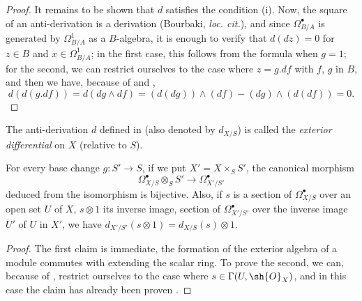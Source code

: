 \begin{proof}
It remains to be shown that $d$ satisfies the condition \rm{(i)}.
Now, the square of an anti-derivation is a derivation (Bourbaki, \emph{loc. cit.}), and since $\Omega_{B/A}^\bullet$ is generated by $\Omega_{B/A}^1$ as a $B$-algebra, it is enough to verify that $d(dz) = 0$ for $z \in B$ and $x \in \Omega_{B/A}^1$;
in the first case, this follows from the formula  when $g = 1$;
for the second, we can restrict ourselves to the case where $z = g.df$ with $f$, $g$ in $B$, and then we have, because of  and , 
\[
  d(d(g.df)) = d(dg \wedge df) = (d(dg)) \wedge (df) - (dg) \wedge (d(df)) = 0.
\] 
\end{proof}

\begin{definition}[16.6.3]
\label{IV.16.6.3}
The anti-derivation $d$ defined in  (also denoted by $d_{X/S}$) is called the \emph{exterior differential} on $X$ (relative to $S$). 
\end{definition}

\begin{proposition}[16.6.4]
\label{IV.16.6.4}
For every base change $g:S' \to S$, if we put $X' = X \times_S S'$, the canonical morphism
\[
  \label{IV.16.6.4.1}
  \Omega_{X/S}^\bullet \otimes_S S' \to \Omega_{X'/S'}^\bullet
  \tag{16.6.4.1}
\]
deduced from the isomorphism  is bijective.
Also, if $s$ is a section of $\Omega_{X/S}^\bullet$ over an open set $U$ of $X$, $s \otimes 1$ its inverse image, section of $\Omega_{X'/S'}^\bullet$ over the inverse image $U'$ of $U$ in $X'$, we have $d_{X'/S'}(s \otimes 1) = d_{X/S}(s) \otimes 1$.
\end{proposition}

\begin{proof}
The first claim is immediate, the formation of the exterior algebra of a module commutes with extending the scalar ring.
To prove the second, we can, because of , restrict ourselves to the case where $s \in \Gamma(U, \sh{O}_X)$, and in this case the claim has already been proven .
\end{proof}

